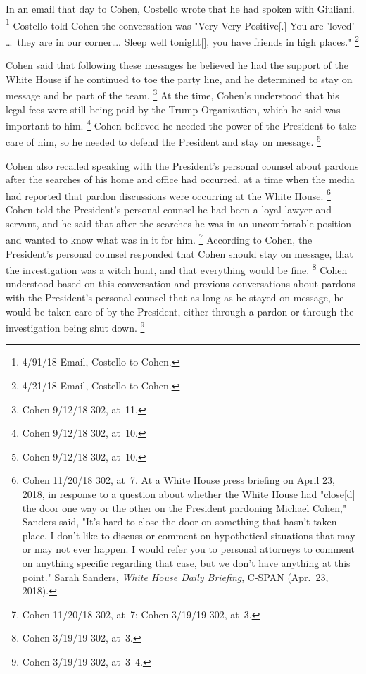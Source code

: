 {In an email that day to Cohen, Costello wrote that he had spoken with Giuliani.%
\footnote{4/91/18 Email, Costello to Cohen.}
Costello told Cohen the conversation was "Very Very Positive[.] You are 'loved' \dots\ they are in our corner\dots. Sleep well tonight[], you have friends in high places."%
\footnote{4/21/18 Email, Costello to Cohen. }

Cohen said that following these messages he believed he had the support of the White House if he continued to toe the party line, and he determined to stay on message and be part of the team.%
\footnote{Cohen 9/12/18 302, at~11.}
At the time, Cohen's understood that his legal fees were still being paid by the Trump Organization, which he said was important to him.%
\footnote{Cohen 9/12/18 302, at~10.}
Cohen believed he needed the power of the President to take care of him, so he needed to defend the President and stay on message.%
\footnote{Cohen 9/12/18 302, at~10.}

Cohen also recalled speaking with the President's personal counsel about pardons after the searches of his home and office had occurred, at a time when the media had reported that pardon discussions were occurring at the White House.%
\footnote{Cohen 11/20/18 302, at~7.
At a White House press briefing on April 23, 2018, in response to a question about whether the White House had "close[d] the door one way or the other on the President pardoning Michael Cohen," Sanders said, "It's hard to close the door on something that hasn't taken place.
I don't like to discuss or comment on hypothetical situations that may or may not ever happen.
I would refer you to personal attorneys to comment on anything specific regarding that case, but we don't have anything at this point."
Sarah Sanders, \textit{White House Daily Briefing}, C-SPAN (Apr.~23, 2018).}
Cohen told the President's personal counsel he had been a loyal lawyer and servant, and he said that after the searches he was in an uncomfortable position and wanted to know what was in it for him.%
\footnote{Cohen 11/20/18 302, at~7;
Cohen 3/19/19 302, at~3.}
According to Cohen, the President's personal counsel responded that Cohen should stay on message, that the investigation was a witch hunt, and that everything would be fine.%
\footnote{Cohen 3/19/19 302, at~3.}
Cohen understood based on this conversation and previous conversations about pardons with the President's personal counsel that as long as he stayed on message, he would be taken care of by the President, either through a pardon or through the investigation being shut down.%
\footnote{Cohen 3/19/19 302, at~3--4.}

}
